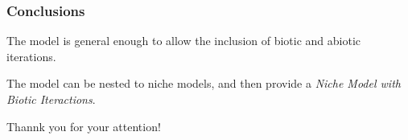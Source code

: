 \documentclass[xcolor=x11names,compress]{beamer}
\renewcommand{\(}{\begin{columns}}
\renewcommand{\)}{\end{columns}}
\newcommand{\<}[1]{\begin{column}{#1}}
\renewcommand{\>}{\end{column}}
\begin{document}
\begin{frame}

\frametitle{Conclusions}

\begin{block}{}
The model is general enough to allow the inclusion of biotic and abiotic iterations. 
\end{block}
\pause

\begin{block}{}
The model can be nested to niche models, and then provide a \emph{Niche Model with Biotic Iteractions}.
\end{block}
\pause


\end{frame}

\begin{frame}{Thannk you for your attention!}
\end{frame}


\end{document}
